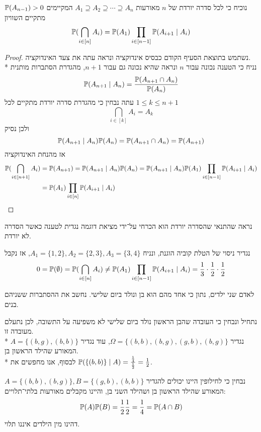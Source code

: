 \Subquestion{}
נוכיח כי לכל סדרה יורדת של $n$ מאורעות $A_1 \supseteq A_2 \supseteq \cdots \supseteq A_n$ המקיימים $\mathbb{P}(A_{n - 1}) > 0$ מתקיים השוויון
\[
	\mathbb{P}(\bigcap_{i \in [n]} A_i) = \mathbb{P}(A_1) \prod_{i \in [n - 1]} \mathbb{P}(A_{i + 1} \mid A_i)
\]
\begin{proof}
	נשתמש בתוצאת הסעיף הקודם כבסיס אינדוקציה ונראה עתה את צעד האינדוקציה. \\*
	נניח כי הטענה נכונה עבור $n$ ונראה שהיא נכונה גם עבור $n + 1$, מהגדרת הסתברות מותנית
	\[
		\mathbb{P}(A_{n + 1} \mid A_n) = \frac{\mathbb{P}(A_{n + 1} \cap A_n)}{\mathbb{P}(A_n)}
	\]
	עתה נבחין כי מהגדרת סדרה יורדת מתקיים לכל $1 \le k \le n + 1$
	\[
		\bigcap_{i \in [k]} A_i = A_k
	\]
	ולכן נסיק
	\[
		\mathbb{P}(A_{n + 1} \mid A_n) \mathbb{P}(A_n) = \mathbb{P}(A_{n + 1} \cap A_n) = \mathbb{P}(A_{n + 1})
	\]
	אז מהנחת האינדוקציה
	\begin{align*}
		\mathbb{P}(\bigcap_{i \in [n + 1]} A_i)
		& = \mathbb{P}(A_{n + 1})
		= \mathbb{P}(A_{n + 1} \mid A_n) \mathbb{P}(A_n)  
		= \mathbb{P}(A_{n + 1} \mid A_n) \mathbb{P}(A_1) \prod_{i \in [n - 1]} \mathbb{P}(A_{i + 1} \mid A_i) \\
		& = \mathbb{P}(A_1) \prod_{i \in [n]} \mathbb{P}(A_{i + 1} \mid A_i)
	\end{align*}
\end{proof}

\Subquestion{}
נראה שהתנאי שהסדרה יורדת הוא הכרחי על־ידי מציאת דוגמה נגדית לטענה כאשר הסדרה לא יורדת.
\begin{solution}
	נגדיר ניסוי של הטלת קוביה הוגנת, ונניח $A_1 = \{1, 2\}, A_2 = \{2, 3\}, A_3 = \{3, 4\}$, אז נקבל
	\[
		0 = \mathbb{P}(\emptyset) = \mathbb{P}(\bigcap_{i \in [n]} A_i) \ne \mathbb{P}(A_1) \prod_{i \in [n - 1]} \mathbb{P}(A_{i + 1} \mid A_i) = \frac{1}{3} \cdot \frac{1}{2} \cdot \frac{1}{2}
	\]
\end{solution}

\Question{}
לאדם שני ילדים, נתון כי אחד מהם הוא בן ונולד ביום שלישי.
נחשב את ההסתברות ששניהם בנים.
\begin{solution}
	נתחיל ונבחין כי העובדה שהבן הראשון נולד ביום שלישי לא משפיעה על התשובה, לכן נתעלם מעובדה זו. \\*
	נגדיר $\Omega = \{ (b, b), (b, g), (g, b), (b, g) \}$, עוד נגדיר $A = \{ (b, g), (b, b) \}$ המאורע שהילד הראשון בן. \\*
	לבסוף, אנו מחפשים את $\mathbb{P}(\{ (b, b) \} \mid A) = \frac{\frac{1}{4}}{\frac{1}{2}} = \frac{1}{2}$.

	נבחין כי לחילופין היינו יכולים להגדיר $A = \{(b, b), (b, g)\}, B = \{(g, b), (b, b)\}$ המאורע שהילד הראשון בן ושהילד השני בן, והיינו מקבלים מאורעות בלתי־תלויים:
	\[
		\mathbb{P}(A) \mathbb{P}(B) = \frac{1}{2} \frac{1}{2} = \frac{1}{4} = \mathbb{P}(A \cap B)
	\]
	דהינו מין הילדים איננו תלוי.
\end{solution}

